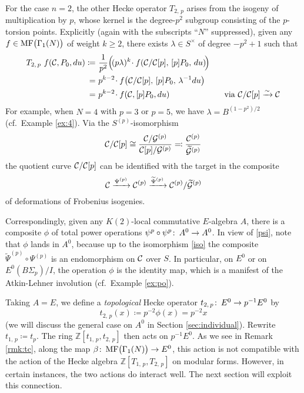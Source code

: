 \documentclass{gtpart}
\theoremstyle{definition}
\theoremstyle{remark}
\def\co{\colon\thinspace}
\newcommand{\mb}[1]{\mathbb{#1}}
\newcommand{\CC}{{\cal C}}
\newcommand{\CG}{{\cal G}}
\newcommand{\BZ}{{\mb Z}}
\newcommand{\MF}{{\rm MF}}
\newcommand{\B}{\beta}
\newcommand{\f}{\phi}
\newcommand{\G}{\Gamma}
\renewcommand{\l}{\lambda}
\newcommand{\ce}{\coloneqq}
\renewcommand{\=}{\approx}
\renewcommand{\-}{\sim}
\numberwithin{equation}{section}
\begin{document}
For the case $n = 2$, the other Hecke operator $T_{2,\,p}$ arises from the 
isogeny of multiplication by $p$, whose kernel is the degree-$p^2$ subgroup 
consisting of the $p$-torsion points.  Explicitly (again with the subscripts 
``$N$'' suppressed), given any $f \in \MF\big(\G_1(N)\big)$ of weight 
$k \geq 2$, there exists $\l \in S^\times$ of degree $-p^2 + 1$ such that 
\begin{equation}
 \label{T2p}
 \begin{split}
  T_{2,\,p}~f(\CC, P_0, du) \ce & ~ \frac{1}{p^2} \Big(\! (p \l)^k \!\cdot 
                                  f\!\left(\CC/\CC[p], \, [p] P_0, \, 
                                  du\right) \!\!\Big) \\
                              = & ~ p^{k - 2} \!\cdot f\!\left(\CC/\CC[p], \, 
                                  [p] P_0, \, \l^{-1} du\right) \\
                              = & ~ p^{k - 2} \!\cdot f(\CC, [p] P_0, du) 
                                  \qquad\qquad\qquad~~ \text{via 
                                  $\CC/\CC[p] \xrightarrow{\sim} \CC$} 
 \end{split}
\end{equation}
For example, when $N = 4$ with $p = 3$ or $p = 5$, we have 
$\lambda = B^{(1 - p^2)/2}$ (cf.~Example \ref{ex:4}).  Via the 
$S^{(p)}$-isomorphism 
\begin{equation}
 \label{iso}
 \CC/\CC[p] \cong \frac{\CC/\CG^{(p)}}{\CC[p]/\CG^{(p)}} \eqqcolon 
 \frac{\CC^{(p)}}{\widetilde{\CG}^{(p)}} 
\end{equation}
the quotient curve $\CC/\CC[p]$ can be identified with the target in the 
composite 
\[
 \CC \xrightarrow{\Psi^{(p)}} \CC^{(p)} \xrightarrow{\widetilde{\Psi}^{(p)}} 
 \CC^{(p)}/\widetilde{\CG}^{(p)} 
\]
of deformations of Frobenius isogenies.  

Correspondingly, given any $K(2)$-local commutative $E$-algebra $A$, there is 
a composite $\f$ of total power operations 
$\psi^p \circ \psi^p \co A^0 \to A^0$.  In view of \eqref{psi}, note that $\phi$ 
lands in $A^0$, because up to the isomorphism \eqref{iso} the composite 
$\widetilde{\Psi}^{(p)} \circ \Psi^{(p)}$ is an endomorphism on $\CC$ over $S$.  
In particular, on $E^0$ or on $E^0(B\Sigma_p) / I$, the operation $\phi$ is the 
identity map, which is a manifest of the Atkin-Lehner involution (cf.~Example 
\ref{ex:po}).  

Taking $A = E$, we define a {\em topological} Hecke operator 
$t_{2,\,p} \co E^0 \to p^{-1} E^0$ by 
\begin{equation}
 \label{t2p}
 t_{2,\,p}(x) \ce p^{-2} \phi(x) = p^{-2} x 
\end{equation}
(we will discuss the general case on $A^0$ in Section \ref{sec:individual}).  
Rewrite $t_{1,\,p} \ce t_p$.  The ring $\BZ[t_{1,\,p},t_{2,\,p}]$ then acts on 
$p^{-1} E^0$.  As we see in Remark \ref{rmk:tc}, along the map 
$\B \co \MF\big(\G_1(N)\big) \to E^0$, this action is not compatible with the 
action of the Hecke algebra $\BZ[T_{1,\,p},T_{2,\,p}]$ on modular forms.  
However, in certain instances, the two actions do interact well.  The next 
section will exploit this connection.  
\end{document}
